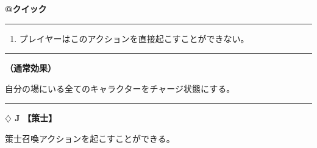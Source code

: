 \documentclass[twocolumn,a5paper,papersize,10pt]{jarticle}
\begin{document}
\begin{tcolorbox}[title={\small\bf【Action】充足}{\scriptsize （誘発）}]

{\scriptsize\bf @クイック }

\vspace{1mm} %
\hrule height 0.1mm depth 0mm width 62mm %
\vspace{1mm} %


\vspace{-1zh}%
\begin{enumerate}
\renewcommand{\labelenumi}{※}
\setlength{\leftskip}{-0.3cm}
\setlength{\itemsep}{0pt} %
\setlength{\parskip}{0pt} %

\item プレイヤーはこのアクションを直接起こすことができない。

\vspace{-3mm}%
\end{enumerate}
\vspace{-2mm} %
\vspace{1zh}%
\vspace{1mm} %
\hrule height 0.1mm depth 0mm width 62mm %
\vspace{1mm} %

{\bf（通常効果）}

自分の場にいる全てのキャラクターをチャージ状態にする。

\vspace{1mm} %
\end{tcolorbox}

\vspace{-1zh}

 
 
 

\vspace{3mm} %
\hrule height 0.5mm depth 0mm width 66.5mm %
\vspace{1mm} %
{\Large\bf $\diamondsuit$ J} {\normalsize\bf【策士】} %
\vspace{1mm} %

策士召喚アクションを起こすことができる。
\end{document}
